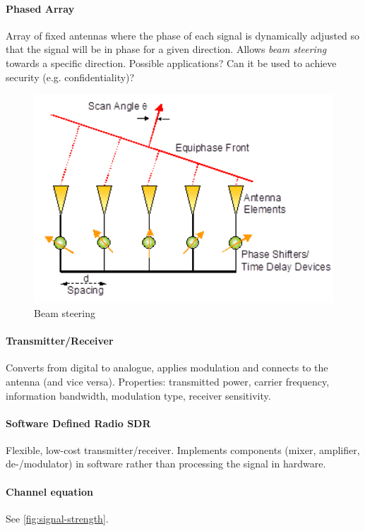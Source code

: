 \paragraph{Phased Array}
Array of fixed antennas where the phase of each signal is dynamically adjusted so that the signal will be in phase for a given direction.
Allows \textit{beam steering} towards a specific direction.
Possible applications? Can it be used to achieve security (e.g. confidentiality)?

\begin{figure}
	\centering
	\includegraphics[scale=0.4]{images/1-beam-steering.png}
	\caption{Beam steering}
	\label{fig:beam-steering}
\end{figure}

\paragraph{Transmitter/Receiver}
Converts from digital to analogue, applies modulation and connects to the antenna (and vice versa).
Properties: transmitted power, carrier frequency, information bandwidth, modulation type, receiver sensitivity.

\paragraph{Software Defined Radio SDR}
Flexible, low-cost transmitter/receiver.
Implements components (mixer, amplifier, de-/modulator) in software rather than processing the signal in hardware.

\paragraph{Channel equation}
See \autoref{fig:signal-strength}.


